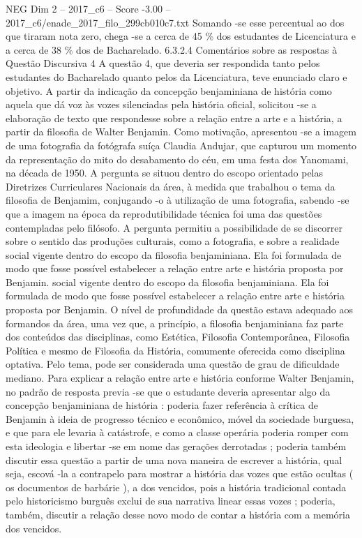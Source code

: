 \begin{textsample}{NEG Dim 2 – 2017\_c6 – Score -3.00 – 2017\_c6/enade\_2017\_filo\_299cb010c7.txt}
Somando -se esse percentual ao dos que tiraram nota zero, chega -se a cerca de 45 \% dos estudantes de Licenciatura e a cerca de 38 \% dos de Bacharelado. 6.3.2.4 Comentários sobre as respostas à Questão Discursiva 4 A questão 4, que deveria ser respondida tanto pelos estudantes do Bacharelado quanto pelos da Licenciatura, teve enunciado claro e objetivo.
A partir da indicação da concepção benjaminiana de história como aquela que dá voz às vozes silenciadas pela história oficial, solicitou -se a elaboração de texto que respondesse sobre a relação entre a arte e a história, a partir da filosofia de Walter Benjamin.
Como motivação, apresentou -se a imagem de uma fotografia da fotógrafa suíça Claudia Andujar, que capturou um momento da representação do mito do desabamento do céu, em uma festa dos Yanomami, na década de 1950.
A pergunta se situou dentro do escopo orientado pelas Diretrizes Curriculares Nacionais da área, à medida que trabalhou o tema da filosofia de Benjamim, conjugando -o à utilização de uma fotografia, sabendo -se que a imagem na época da reprodutibilidade técnica foi uma das questões contempladas pelo filósofo.
A pergunta permitiu a possibilidade de se discorrer sobre o sentido das produções culturais, como a fotografia, e sobre a realidade social vigente dentro do escopo da filosofia benjaminiana.
Ela foi formulada de modo que fosse possível estabelecer a relação entre arte e história proposta por Benjamin. social vigente dentro do escopo da filosofia benjaminiana.
Ela foi formulada de modo que fosse possível estabelecer a relação entre arte e história proposta por Benjamin.
O nível de profundidade da questão estava adequado aos formandos da área, uma vez que, a princípio, a filosofia benjaminiana faz parte dos conteúdos das disciplinas, como Estética, Filosofia Contemporânea, Filosofia Política e mesmo de Filosofia da História, comumente oferecida como disciplina optativa.
Pelo tema, pode ser considerada uma questão de grau de dificuldade mediano.
Para explicar a relação entre arte e história conforme Walter Benjamin, no padrão de resposta previa -se que o estudante deveria apresentar algo da concepção benjaminiana de história : poderia fazer referência à crítica de Benjamin à ideia de progresso técnico e econômico, móvel da sociedade burguesa, e que para ele levaria à catástrofe, e como a classe operária poderia romper com esta ideologia e libertar -se em nome das gerações derrotadas ; poderia também discutir essa questão a partir de uma nova maneira de escrever a história, qual seja, escová -la a contrapelo para mostrar a história das vozes que estão ocultas ( os documentos de barbárie ), a dos vencidos, pois a história tradicional contada pelo historicismo burguês exclui de sua narrativa linear essas vozes ; poderia, também, discutir a relação desse novo modo de contar a história com a memória dos vencidos.

\end{textsample}
